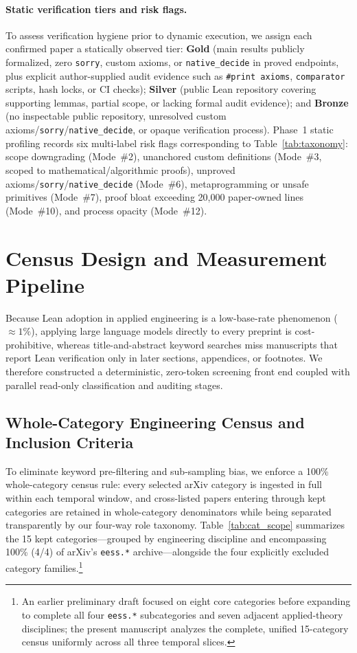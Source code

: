 \documentclass[11pt,letterpaper]{article}
\begin{document}
\paragraph{Static verification tiers and risk flags.}
To assess verification hygiene prior to dynamic execution, we assign each confirmed paper a statically observed tier: \textbf{Gold} (main results publicly formalized, zero \texttt{sorry}, custom axioms, or \texttt{native\_decide} in proved endpoints, plus explicit author-supplied audit evidence such as \texttt{\#print axioms}, \texttt{comparator} scripts, hash locks, or CI checks); \textbf{Silver} (public Lean repository covering supporting lemmas, partial scope, or lacking formal audit evidence); and \textbf{Bronze} (no inspectable public repository, unresolved custom axioms/\texttt{sorry}/\texttt{native\_decide}, or opaque verification process). Phase~1 static profiling records six multi-label risk flags corresponding to Table~\ref{tab:taxonomy}: scope downgrading (Mode~\#2), unanchored custom definitions (Mode~\#3, scoped to mathematical/algorithmic proofs), unproved axioms/\texttt{sorry}/\texttt{native\_decide} (Mode~\#6), metaprogramming or unsafe primitives (Mode~\#7), proof bloat exceeding 20,000 paper-owned lines (Mode~\#10), and process opacity (Mode~\#12).

\section{Census Design and Measurement Pipeline}
\label{sec:pipeline}

Because Lean adoption in applied engineering is a low-base-rate phenomenon ($\approx 1\%$), applying large language models directly to every preprint is cost-prohibitive, whereas title-and-abstract keyword searches miss manuscripts that report Lean verification only in later sections, appendices, or footnotes. We therefore constructed a deterministic, zero-token screening front end coupled with parallel read-only classification and auditing stages.

\subsection{Whole-Category Engineering Census and Inclusion Criteria}
\label{sec:cat_scope}

To eliminate keyword pre-filtering and sub-sampling bias, we enforce a 100\% whole-category census rule: every selected arXiv category is ingested in full within each temporal window, and cross-listed papers entering through kept categories are retained in whole-category denominators while being separated transparently by our four-way role taxonomy. Table~\ref{tab:cat_scope} summarizes the 15 kept categories---grouped by engineering discipline and encompassing 100\% (4/4) of arXiv's \texttt{eess.*} archive---alongside the four explicitly excluded category families.\footnote{An earlier preliminary draft focused on eight core categories before expanding to complete all four \texttt{eess.*} subcategories and seven adjacent applied-theory disciplines; the present manuscript analyzes the complete, unified 15-category census uniformly across all three temporal slices.}
\end{document}
